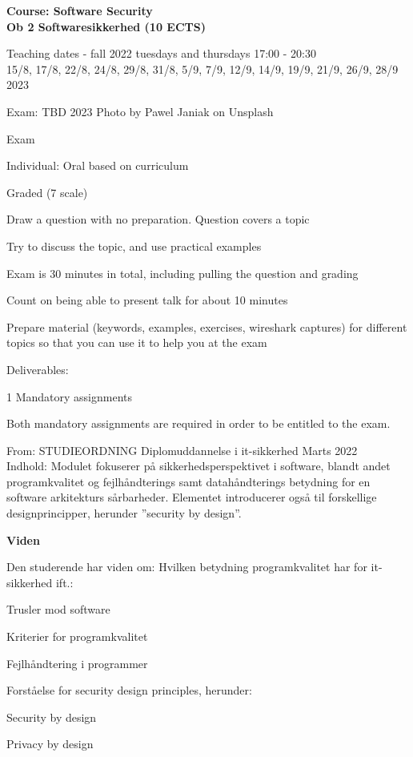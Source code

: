 \documentclass[Screen16to9,17pt]{foils}
\begin{document}

{\Large\bf Course: Software Security\\
Ob 2 Softwaresikkerhed (10 ECTS)}

Teaching dates - fall 2022 tuesdays and thursdays 17:00 - 20:30\\
15/8, 17/8, 22/8, 24/8, 29/8, 31/8, 5/9, 7/9, 12/9, 14/9, 19/9, 21/9, 26/9, 28/9 2023

Exam: TBD 2023 \hskip 12cm Photo by Pawel Janiak on Unsplash





\begin{list2}
\item Exam
\item Individual: Oral based on curriculum
\item Graded (7 scale)
\item Draw a question with no preparation. Question covers a topic
\item Try to discuss the topic, and use practical examples
\item Exam is 30 minutes in total, including pulling the question and grading
\item Count on being able to present talk for about 10 minutes
\item Prepare material (keywords, examples, exercises, wireshark captures) for different topics so that you can use it to help you at the exam

\vskip 5mm
\item Deliverables:
\item 1 Mandatory assignments
\item Both mandatory assignments are required in order to be entitled to the exam.
\end{list2}


From: STUDIEORDNING Diplomuddannelse i it-sikkerhed Marts 2022\\
Indhold: Modulet fokuserer på sikkerhedsperspektivet i software, blandt andet
programkvalitet og fejlhåndterings samt datahåndterings betydning for en
software arkitekturs sårbarheder.
Elementet introducerer også til forskellige designprincipper, herunder ”security by design”.

{\bf Viden}

Den studerende har viden om:
Hvilken betydning programkvalitet har for it-sikkerhed ift.:
\begin{list2}
\item Trusler mod software
\item Kriterier for programkvalitet
\item Fejlhåndtering i programmer
\item Forståelse for security design principles, herunder:
\item Security by design
\item Privacy by design
\end{list2}
\end{document}
